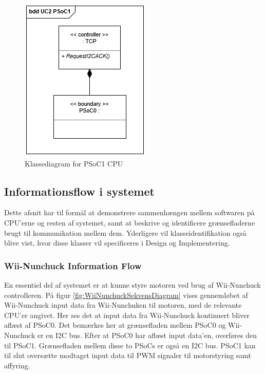 \begin{figure}[H]
	\centering
	\includegraphics[]{SystemArkitektur/images/klassediagramPSoC1}
	\caption{Klassediagram for PSoC1 CPU}
	\label{figure:initialKlassediagramPSoC1}
\end{figure}


\subsection{Informationsflow i systemet}
\label{afsnit:informationFlow}
Dette afsnit har til formål at demonstrere sammenhængen mellem softwaren på CPU'erne og resten af systemet, samt at beskrive og identificere grænsefladerne brugt til kommunikation mellem dem. Yderligere vil klasseidentifikation også blive vist, hvor disse klasser vil specificeres i Design og Implementering.

\subsubsection{Wii-Nunchuck Information Flow}
En essentiel del af systemet er at kunne styre motoren ved brug af Wii-Nunchuck controlleren. På figur \ref{fig:WiiNunchuckSekvensDiagram} vises gennemløbet af Wii-Nunchuck input data fra Wii-Nunchuken til motoren, med de relevante CPU'er angivet. Her ses det at input data fra Wii-Nunchuck kontinuert bliver aflæst af PSoC0. Det bemærkes her at grænsefladen mellem PSoC0 og Wii-Nunchuck er en I2C bus. Efter at PSoC0 har aflæst input data'en, overføres den til PSoC1. Grænsefladen mellem disse to PSoCs er også en I2C bus. PSoC1 kan til slut oversætte modtaget input data til PWM signaler til motorstyring samt affyring.

